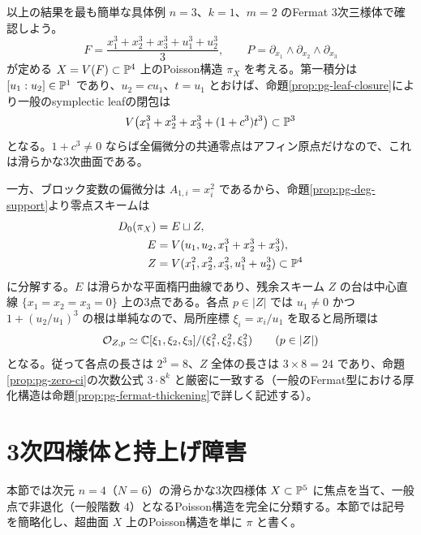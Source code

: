 \begin{example}\label{ex:pg-fermat-threefold-leaves-zeros}
以上の結果を最も簡単な具体例 $n=3$、$k=1$、$m=2$ のFermat 3次三様体で確認しよう。
\begin{equation}\label{eq:pg-fermat-threefold}
F=\frac{x_1^3+x_2^3+x_3^3+u_1^3+u_2^3}{3},
\qquad
P=\partial_{x_1}\wedge\partial_{x_2}\wedge\partial_{x_3}
\end{equation}
が定める $X=V(F)\subset\mathbb P^4$ 上のPoisson構造 $\pi_X$ を考える。第一積分は $[u_1:u_2]\in\mathbb P^1$ であり、$u_2=cu_1$、$t=u_1$ とおけば、命題\ref{prop:pg-leaf-closure}により一般のsymplectic leafの閉包は
\begin{equation}\label{eq:pg-fermat-threefold-leaf}
V\bigl(x_1^3+x_2^3+x_3^3+(1+c^3)t^3\bigr)\subset\mathbb P^3
\end{equation}
となる。$1+c^3\neq0$ ならば全偏微分の共通零点はアフィン原点だけなので、これは滑らかな3次曲面である。

一方、ブロック変数の偏微分は $A_{1,i}=x_i^2$ であるから、命題\ref{prop:pg-deg-support}より零点スキームは
\begin{equation}\label{eq:pg-fermat-threefold-zeros}
\begin{aligned}
D_0(\pi_X)&=E\sqcup Z,\\
E&=V(u_1,u_2,x_1^3+x_2^3+x_3^3),\\
Z&=V(x_1^2,x_2^2,x_3^2,u_1^3+u_2^3)\subset\mathbb P^4
\end{aligned}
\end{equation}
に分解する。$E$ は滑らかな平面楕円曲線であり、残余スキーム $Z$ の台は中心直線 $\{x_1=x_2=x_3=0\}$ 上の3点である。各点 $p\in|Z|$ では $u_1\neq0$ かつ $1+(u_2/u_1)^3$ の根は単純なので、局所座標 $\xi_i=x_i/u_1$ を取ると局所環は
\begin{equation}\label{eq:pg-fermat-threefold-zero-ring}
\mathcal O_{Z,p}\simeq
\mathbb C[\xi_1,\xi_2,\xi_3]/(\xi_1^2,\xi_2^2,\xi_3^2)
\qquad(p\in|Z|)
\end{equation}
となる。従って各点の長さは $2^3=8$、$Z$ 全体の長さは $3\times8=24$ であり、命題\ref{prop:pg-zero-ci}の次数公式 $3\cdot8^k$ と厳密に一致する（一般のFermat型における厚化構造は命題\ref{prop:pg-fermat-thickening}で詳しく記述する）。
\end{example}

\section{3次四様体と持上げ障害}\label{sec:pg-fourfold}

本節では次元 $n=4$（$N=6$）の滑らかな3次四様体 $X\subset\mathbb P^5$ に焦点を当て、一般点で非退化（一般階数 $4$）となるPoisson構造を完全に分類する。本節では記号を簡略化し、超曲面 $X$ 上のPoisson構造を単に $\pi$ と書く。

